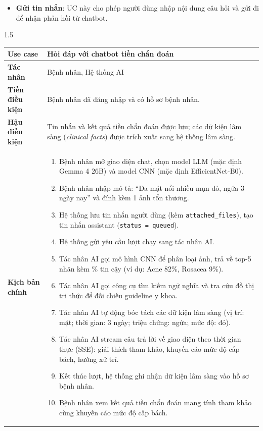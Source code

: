 \begin{itemize}[nosep,leftmargin=*]
  \item \textbf{Gửi tin nhắn}: UC này cho phép người dùng nhập nội dung câu hỏi và gửi đi để nhận phản hồi từ chatbot.
\end{itemize}

\begin{spacing}{1.5}
\renewcommand{\arraystretch}{1.15}
\begin{longtable}{|>{\raggedright\arraybackslash}p{}|>{\raggedright\arraybackslash}p{}|}
\hline
\textbf{Use case} & Hỏi đáp với chatbot tiền chẩn đoán \\ \hline
\textbf{Tác nhân} & Bệnh nhân, Hệ thống AI \\ \hline
\textbf{Tiền điều kiện} & Bệnh nhân đã đăng nhập và có hồ sơ bệnh nhân. \\ \hline
\textbf{Hậu điều kiện} & Tin nhắn và kết quả tiền chẩn đoán được lưu; các dữ kiện lâm sàng (\textit{clinical facts}) được trích xuất sang hệ thống lâm sàng. \\ \hline
\textbf{Kịch bản chính} &
\begin{enumerate}[nosep,leftmargin=*]
  \item Bệnh nhân mở giao diện chat, chọn model LLM (mặc định Gemma 4 26B) và model CNN (mặc định EfficientNet-B0).
  \item Bệnh nhân nhập mô tả: ``Da mặt nổi nhiều mụn đỏ, ngứa 3 ngày nay'' và đính kèm 1 ảnh tổn thương.
  \item Hệ thống lưu tin nhắn người dùng (kèm \texttt{attached\_files}), tạo tin nhắn assistant (\texttt{status = queued}).
  \item Hệ thống gửi yêu cầu lượt chạy sang tác nhân AI.
  \item Tác nhân AI gọi mô hình CNN để phân loại ảnh, trả về top-5 nhãn kèm \% tin cậy (ví dụ: Acne 82\%, Rosacea 9\%).
  \item Tác nhân AI gọi công cụ tìm kiếm ngữ nghĩa và tra cứu đồ thị tri thức để đối chiếu guideline y khoa.
  \item Tác nhân AI tự động bóc tách các dữ kiện lâm sàng (vị trí: mặt; thời gian: 3 ngày; triệu chứng: ngứa; mức độ: đỏ).
  \item Tác nhân AI stream câu trả lời về giao diện theo thời gian thực (SSE): giải thích tham khảo, khuyến cáo mức độ cấp bách, hướng xử trí.
  \item Kết thúc lượt, hệ thống ghi nhận dữ kiện lâm sàng vào hồ sơ bệnh nhân.
  \item Bệnh nhân xem kết quả tiền chẩn đoán mang tính tham khảo cùng khuyến cáo mức độ cấp bách.

\end{enumerate}
\end{longtable}
\end{spacing}
